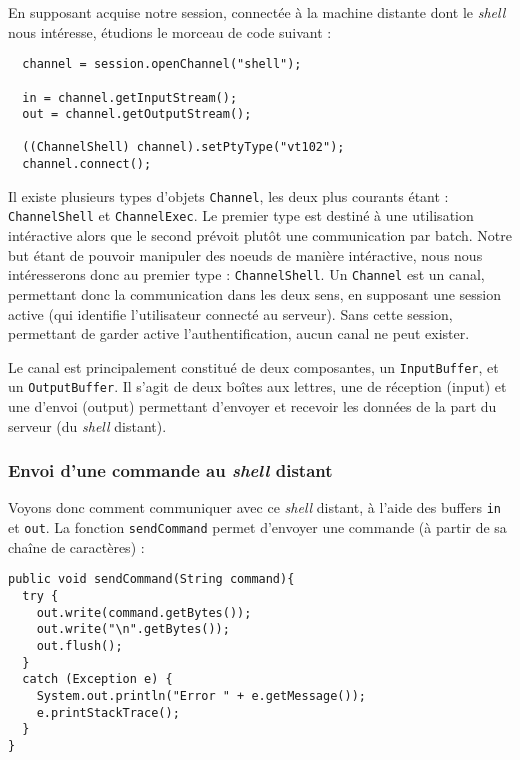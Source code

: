 \par En supposant acquise notre session, connectée à la machine distante dont le \emph{shell} nous intéresse, étudions le morceau de code suivant :

\begin{verbatim}
  channel = session.openChannel("shell");
  
  in = channel.getInputStream();
  out = channel.getOutputStream();
  
  ((ChannelShell) channel).setPtyType("vt102");
  channel.connect();
\end{verbatim}

\par Il existe plusieurs types d'objets \texttt{Channel}, les deux plus courants étant : \texttt{ChannelShell} et \texttt{ChannelExec}. Le premier type est destiné à une utilisation intéractive alors que le second prévoit plutôt une communication par batch. Notre but étant de pouvoir manipuler des noeuds de manière intéractive, nous nous intéresserons donc au premier type : \texttt{ChannelShell}. Un \texttt{Channel} est un canal, permettant donc la communication dans les deux sens, en supposant une session active (qui identifie l'utilisateur connecté au serveur). Sans cette session, permettant de garder active l'authentification, aucun canal ne peut exister.
\par Le canal est principalement constitué de deux composantes, un \texttt{InputBuffer}, et un \texttt{OutputBuffer}. Il s'agit de deux boîtes aux lettres, une de réception (input) et une d'envoi (output) permettant d'envoyer et recevoir les données de la part du serveur (du \emph{shell} distant). 

\subsubsection{Envoi d'une commande au \emph{shell} distant}
\label{sec:envoi-dune-commande}

\par Voyons donc comment communiquer avec ce \emph{shell} distant, à l'aide des buffers \texttt{in} et \texttt{out}. La fonction \texttt{sendCommand} permet d'envoyer une commande (à partir de sa chaîne de caractères) :

\begin{verbatim}
public void sendCommand(String command){
  try {
    out.write(command.getBytes());
    out.write("\n".getBytes());
    out.flush();
  }
  catch (Exception e) {
    System.out.println("Error " + e.getMessage());
    e.printStackTrace();
  }
}
\end{verbatim}

